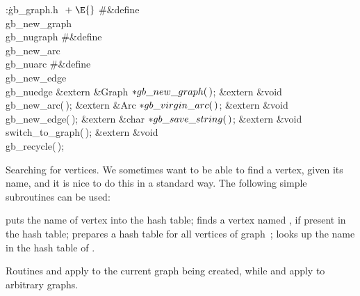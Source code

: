 \B{}:\.{gb\_graph.h }\X${}\mathrel+\E{}$\6
\8\#\&{define} \\{gb\_new\_graph}\5\\{gb\_nugraph}\6
\8\#\&{define} \\{gb\_new\_arc}\5\\{gb\_nuarc}\6
\8\#\&{define} \\{gb\_new\_edge}\5\\{gb\_nuedge}\6
\&{extern} \&{Graph} ${}{*}\\{gb\_new\_graph}(\,){}$;\6
\&{extern} \&{void} \\{gb\_new\_arc}(\,);\6
\&{extern} \&{Arc} ${}{*}\\{gb\_virgin\_arc}(\,){}$;\6
\&{extern} \&{void} \\{gb\_new\_edge}(\,);\6
\&{extern} \&{char} ${}{*}\\{gb\_save\_string}(\,){}$;\6
\&{extern} \&{void} \\{switch\_to\_graph}(\,);\6
\&{extern} \&{void} \\{gb\_recycle}(\,);\par
\fi

Searching for vertices. We sometimes want to be able to find a vertex,
given
its name, and it is nice to do this in a standard way. The following simple
subroutines can be used:

{\narrower
\smallskip{} puts the name of vertex  into the hash
table;
\smallskip{} finds a vertex named , if present in
the hash table;
\smallskip{} prepares a hash table for all vertices of
graph~;
\smallskip{} looks up the name  in the
hash table of .
\smallskip}

\noindent Routines  and  apply to the
current graph being
created, while  and  apply to
arbitrary graphs.

